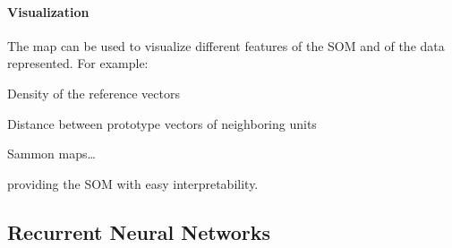 \documentclass[10pt]{report}
\begin{document}
\paragraph{Visualization} The map can be used to visualize different features of the SOM and of the data represented. For example:
\begin{list}{}{}
	\item Density of the reference vectors
	\item Distance between prototype vectors of neighboring units
	\item Sammon maps\ldots
\end{list}
providing the SOM with easy interpretability.
\pagebreak
\subsection{Recurrent Neural Networks}
\end{document}
